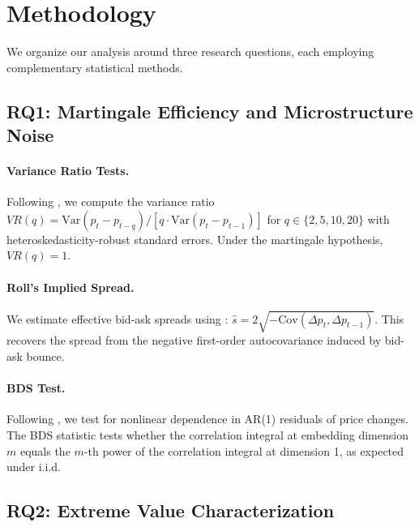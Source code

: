 \documentclass[11pt]{article}
\begin{document}

\section{Methodology}
\label{sec:methodology}

We organize our analysis around three research questions, each employing complementary statistical methods.

\subsection{RQ1: Martingale Efficiency and Microstructure Noise}
\label{sec:method_efficiency}

\paragraph{Variance Ratio Tests.}
Following \citet{lo1988stock}, we compute the variance ratio $VR(q) = \text{Var}(p_t - p_{t-q}) / [q \cdot \text{Var}(p_t - p_{t-1})]$ for $q \in \{2, 5, 10, 20\}$ with heteroskedasticity-robust standard errors. Under the martingale hypothesis, $VR(q) = 1$.

\paragraph{Roll's Implied Spread.}
We estimate effective bid-ask spreads using \citet{roll1984simple}: $\hat{s} = 2\sqrt{-\text{Cov}(\Delta p_t, \Delta p_{t-1})}$. This recovers the spread from the negative first-order autocovariance induced by bid-ask bounce.

\paragraph{BDS Test.}
Following \citet{brock1996test}, we test for nonlinear dependence in AR(1) residuals of price changes. The BDS statistic tests whether the correlation integral at embedding dimension $m$ equals the $m$-th power of the correlation integral at dimension 1, as expected under i.i.d.

\subsection{RQ2: Extreme Value Characterization}
\label{sec:method_evt}
\end{document}
